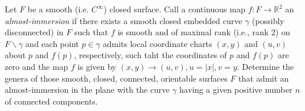 Let $F$ be a smooth (i.e. $C^{\infty}$) closed surface. Call a continuous map $f\colon F\rightarrow \mathbb{R}^2$ an \textit{almost-immersion} if there exists a smooth closed embedded curve $\gamma$ (possibly disconnected) in $F$ such that $f$ is smooth and of maximal rank (i.e., rank 2) on $F\backslash \gamma$ and each point $p\in\gamma$ admits local coordinate charts $(x,y)$ and $(u,v)$ about $p$ and $f(p)$, respectively, such taht the coordinates of $p$ and $f(p)$ are zero and the map $f$ is given by $(x,y)\rightarrow (u,v), u=|x|, v=y$.
Determine the genera of those smooth, closed, connected, orientable surfaces $F$ that admit an almost-immersion in the plane with the curve $\gamma$ having a given positive number $n$ of connected components.